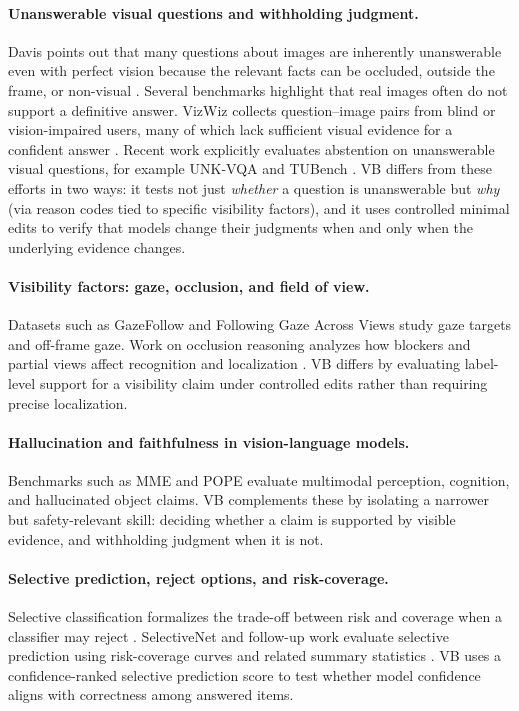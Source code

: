 \documentclass[11pt]{article}
\newcommand{\benchmarkname}{\textsc{VB}}
\begin{document}
\paragraph{Unanswerable visual questions and withholding judgment.}
Davis points out that many questions about images are inherently unanswerable even with perfect vision because the relevant facts can be occluded, outside the frame, or non-visual \citep{davis_unanswerable_images}. Several benchmarks highlight that real images often do not support a definitive answer. VizWiz collects question--image pairs from blind or vision-impaired users, many of which lack sufficient visual evidence for a confident answer \citep{gurari_vizwiz_2018}. Recent work explicitly evaluates abstention on unanswerable visual questions, for example UNK-VQA \citep{guo_unkvqa_2023} and TUBench \citep{he_tubench_2024}. \benchmarkname{} differs from these efforts in two ways: it tests not just \emph{whether} a question is unanswerable but \emph{why} (via reason codes tied to specific visibility factors), and it uses controlled minimal edits to verify that models change their judgments when and only when the underlying evidence changes.

\paragraph{Visibility factors: gaze, occlusion, and field of view.}
Datasets such as GazeFollow \citep{recasens_gazefollow_2015} and Following Gaze Across Views \citep{recasens_following_gaze_2017} study gaze targets and off-frame gaze. Work on occlusion reasoning analyzes how blockers and partial views affect recognition and localization \citep{jiang_peekaboo_2020}. \benchmarkname{} differs by evaluating label-level support for a visibility claim under controlled edits rather than requiring precise localization.

\paragraph{Hallucination and faithfulness in vision-language models.}
Benchmarks such as MME \citep{fu_mme_2023} and POPE \citep{li_pope_2023} evaluate multimodal perception, cognition, and hallucinated object claims. \benchmarkname{} complements these by isolating a narrower but safety-relevant skill: deciding whether a claim is supported by visible evidence, and withholding judgment when it is not.

\paragraph{Selective prediction, reject options, and risk-coverage.}
Selective classification formalizes the trade-off between risk and coverage when a classifier may reject \citep{elyaniv_selective_2010}. SelectiveNet and follow-up work evaluate selective prediction using risk-coverage curves and related summary statistics \citep{geifman_selectivenet_2019,varshney_selective_2022}. \benchmarkname{} uses a confidence-ranked selective prediction score to test whether model confidence aligns with correctness among answered items.
\end{document}

